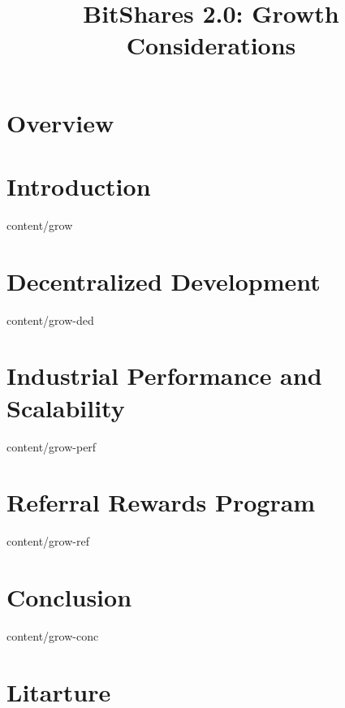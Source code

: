 \documentclass[conference,final,10pt,a4paper]{IEEEtran}
\title{BitShares 2.0: Growth Considerations}
\author{}
\begin{document}
\sloppy
\maketitle

\begin{abstract}
\end{abstract}

\section{Overview}
\section  { Introduction                           }  { content/grow      } 
\section  { Decentralized Development              }  { content/grow-ded  } 
\section  { Industrial Performance and Scalability }  { content/grow-perf } 
\section  { Referral Rewards Program               }  { content/grow-ref  } 
\section  { Conclusion                             }  { content/grow-conc } 
\section* { Litarture                              } 
\end{document}
